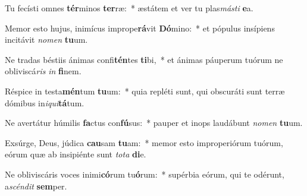 \item Tu fecísti omnes \textbf{tér}minos \textbf{ter}ræ:~* æstátem et ver tu plas\textit{másti} \textbf{e}a.
\item Memor esto hujus, inimícus imprope\textbf{rá}vit \textbf{Dó}mino:~* et pópulus insípiens incitávit \textit{nomen} \textbf{tu}um.
\item Ne tradas béstiis ánimas confi\textbf{tén}tes \textbf{ti}bi,~* et ánimas páuperum tuórum ne obliviscá\tinyhspace\textit{ris} \textit{in} \textbf{fi}nem.
\item Réspice in testa\textbf{mén}tum \textbf{tu}um:~* quia repléti sunt, qui obscuráti sunt terræ dómibus in\textit{iqui}\textbf{tá}tum.
\item Ne avertátur húmilis \textbf{fa}ctus con\textbf{fú}sus:~* pauper et inops laudábunt \textit{nomen} \textbf{tu}um.
\item Exsúrge, Deus, júdica \textbf{cau}sam \textbf{tu}am:~* memor esto improperiórum tuórum, eórum quæ ab insipiénte sunt \textit{tota} \textbf{di}e.
\item Ne obliviscáris voces inimi\textbf{có}rum tu\textbf{ó}rum:~* supérbia eórum, qui te odérunt, a\hspace*{0.06em}\textit{scéndit} \textbf{sem}per.
